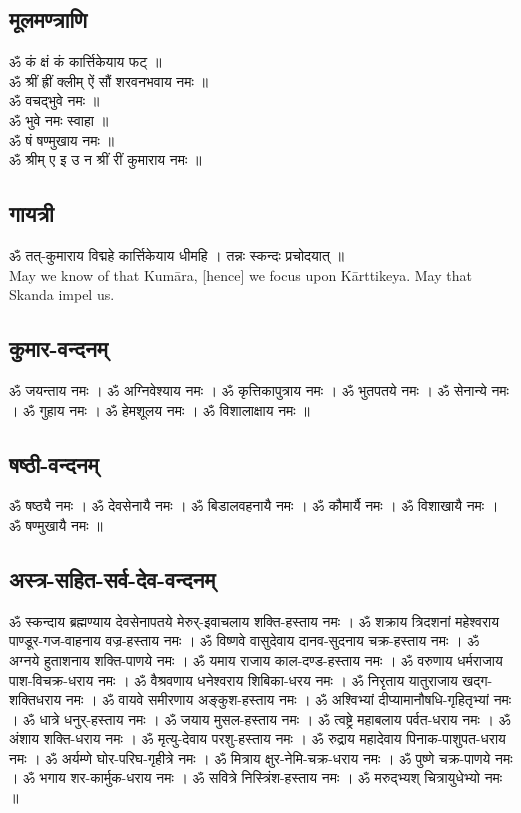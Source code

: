 \documentclass[13pt]{article}
\begin{document}
\subsection{{\skt मूलमण्त्राणि }}
{\normalsize{\skt ॐ कं क्षं कं कार्त्तिकेयाय फट् ॥\\
ॐ श्रीं ह्रीं क्लीम् ऐं सौं शरवनभवाय नमः ॥\\
ॐ वचद्भुवे नमः ॥\\
ॐ भुवे नमः स्वाहा ॥\\
ॐ षं षण्मुखाय नमः ॥\\
ॐ श्रीम् ए इ उ न श्रीं रीं कुमाराय नमः ॥
}\\
\subsection{{\skt गायत्री }}
{\skt ॐ तत्-कुमाराय विद्महे कार्त्तिकेयाय धीमहि । तन्नः स्कन्दः प्रचोदयात् ॥
}\\[8pt]
May we know of that Kumāra, [hence] we focus upon Kārttikeya. May that Skanda impel us.
\subsection{{\skt कुमार-वन्दनम् }}
{\skt ॐ जयन्ताय नमः । ॐ अग्निवेश्याय नमः । ॐ कृत्तिकापुत्राय नमः । ॐ भुतपतये नमः । ॐ सेनान्ये नमः । ॐ गुहाय नमः । ॐ हेमशूलय नमः । ॐ विशालाक्षाय नमः ॥
}
\subsection{{\skt षष्ठी-वन्दनम् }}
{\skt ॐ षष्ठ्यै नमः । ॐ देवसेनायै नमः । ॐ बिडालवहनायै नमः । ॐ कौमार्यै नमः । ॐ विशाखायै नमः । ॐ षण्मुखायै नमः ॥  
}
\subsection{{\skt अस्त्र-सहित-सर्व-देव-वन्दनम् }}
{\skt ॐ स्कन्दाय ब्रह्मण्याय देवसेनापतये मेरुर्-इवाचलाय शक्ति-हस्ताय नमः । ॐ शक्राय त्रिदशनां महेश्वराय पाण्डूर-गज-वाहनाय वज्र-हस्ताय नमः । ॐ विष्णवे वासुदेवाय दानव-सुदनाय चक्र-हस्ताय नमः । ॐ अग्नये हुताशनाय शक्ति-पाणये नमः । ॐ यमाय राजाय काल-दण्ड-हस्ताय नमः । ॐ वरुणाय धर्मराजाय पाश-विचक्र-धराय नमः । ॐ वैश्रवणाय धनेश्वराय शिबिका-धरय नमः । ॐ निरृताय यातुराजाय खद्ग-शक्तिधराय नमः । ॐ वायवे समीरणाय अङ्कुश-हस्ताय नमः । ॐ अश्विभ्यां दीप्यामानौषधि-गृहितृभ्यां नमः । ॐ धात्रे धनुर्-हस्ताय  नमः । ॐ जयाय मुसल-हस्ताय  नमः । ॐ त्वष्ट्रे महाबलाय पर्वत-धराय नमः । ॐ अंशाय शक्ति-धराय  नमः । ॐ मृत्यु-देवाय परशु-हस्ताय  नमः । ॐ रुद्राय महादेवाय पिनाक-पाशुपत-धराय  नमः । ॐ अर्यम्णे घोर-परिघ-गृहीत्रे नमः । ॐ मित्राय क्षुर-नेमि-चक्र-धराय  नमः । ॐ पुष्णे चक्र-पाणये  नमः । ॐ भगाय शर-कार्मुक-धराय  नमः । ॐ सवित्रे निस्त्रिंश-हस्ताय नमः । ॐ मरुद्भ्यश् चित्रायुधेभ्यो  नमः ॥ 
}
}
\end{document}
